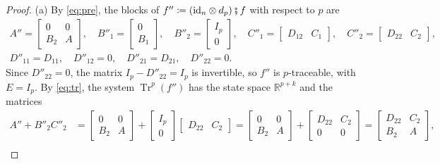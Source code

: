 \documentclass[11pt,a4paper]{article}
\theoremstyle{plain}
\theoremstyle{definition}
\theoremstyle{remark}
\DeclareMathOperator{\Tr}{Tr}
\newcommand{\R}{\mathbb{R}}
\newcommand{\id}{\mathrm{id}}
\newcommand{\then}{\mathbin{\fatsemi}}
\begin{document}
\begin{proof}
    (a) By \cref{eq:pre}, the blocks of $f'' \coloneqq (\id_n \otimes d_p) \then f$ with respect to $p$ are
    \begin{equation*}
        \begin{gathered}
            A'' = \begin{bmatrix} 0 & 0 \\ B_2 & A \end{bmatrix},
            \quad
            B''_1 = \begin{bmatrix} 0 \\ B_1 \end{bmatrix},
            \quad
            B''_2 = \begin{bmatrix} I_p \\ 0 \end{bmatrix},
            \quad
            C''_1 = \begin{bmatrix} D_{12} & C_1 \end{bmatrix},
            \quad
            C''_2 = \begin{bmatrix} D_{22} & C_2 \end{bmatrix}, \\
            D''_{11} = D_{11}, \quad D''_{12} = 0, \quad D''_{21} = D_{21}, \quad D''_{22} = 0 .
        \end{gathered}
    \end{equation*}
    Since $D''_{22} = 0$, the matrix $I_p - D''_{22} = I_p$ is invertible, so $f''$ is $p$-traceable, with $E = I_p$.
    By \cref{eq:tr}, the system $\Tr^p(f'')$ has the state space $\R^{p+k}$ and the matrices
    \begin{align*}
        A'' + B''_2 C''_2
         & = \begin{bmatrix} 0 & 0 \\ B_2 & A \end{bmatrix} + \begin{bmatrix} I_p \\ 0 \end{bmatrix} \begin{bmatrix} D_{22} & C_2 \end{bmatrix}
        = \begin{bmatrix} 0 & 0 \\ B_2 & A \end{bmatrix} + \begin{bmatrix} D_{22} & C_2 \\ 0 & 0 \end{bmatrix}
        = \begin{bmatrix} D_{22} & C_2 \\ B_2 & A \end{bmatrix}, \\

\end{align*}
\end{proof}
\end{document}
